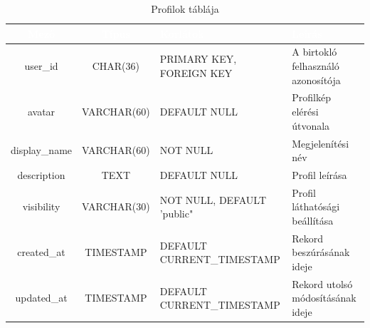 \documentclass[12pt]{report}
\begin{document}
\begin{table}[h!]
    \centering
    \renewcommand{\arraystretch}{1.5}  %
    \begin{tabularx}{\textwidth}{|c|c|>{\raggedright\arraybackslash}X|>{\raggedright\arraybackslash}X|}  %
        \hline
        \rowcolor{gray!30} \textcolor{white}{\textbf{Mező}} & \textcolor{white}{\textbf{Típus}} & \textcolor{white}{\textbf{Korlátok}} & \textcolor{white}{\textbf{Leírás}} \\
        \hline
        user\_id & CHAR(36) & PRIMARY KEY, FOREIGN KEY & A birtokló felhasználó azonosítója \\
        \hline
        avatar & VARCHAR(60) & DEFAULT NULL & Profilkép elérési útvonala \\
        \hline
        display\_name & VARCHAR(60) & NOT NULL & Megjelenítési név \\
        \hline
        description & TEXT & DEFAULT NULL & Profil leírása \\
        \hline
        visibility & VARCHAR(30) & NOT NULL, DEFAULT 'public" & Profil láthatósági beállítása \\
        \hline
        created\_at & TIMESTAMP & DEFAULT CURRENT\_TIMESTAMP & Rekord beszúrásának ideje \\
        \hline
        updated\_at & TIMESTAMP & DEFAULT CURRENT\_TIMESTAMP & Rekord utolsó módosításának ideje \\
        \hline
    \end{tabularx}
    \caption{Profilok táblája}
    \label{tab:profiles}
\end{table}
\end{document}
